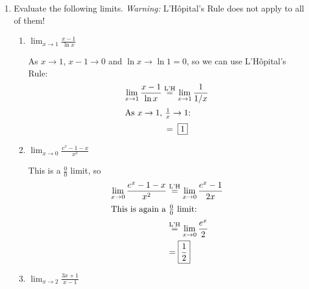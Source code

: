 \documentclass[main]{subfiles}
\begin{document}
\begin{enumerate}
\item 
  Evaluate the following limits.  \emph{Warning:} L'Hôpital's Rule does
  not apply to all of them!
  \begin{enumerate}
  \item
    \begin{problem}[100pt]
      $\displaystyle \lim_{x \to 1} \frac{x - 1}{\ln x}$      
    \end{problem}

    \begin{solution}
      As $x \to 1$, $x - 1 \to 0$ and $\ln x \to \ln 1 =
      0$, so we can use L'Hôpital's Rule:
      \begin{align*}
        \lim_{x \to 1} \frac{x - 1}{\ln x} 
        & \lheq \lim_{x \to 1} \frac{1}{1/x} \\
        \intertext{As $x \to 1$, $\frac{1}{x} \to 1$:}
        & \nolheq \boxed{1}
      \end{align*}
    \end{solution}

  \item


    \begin{problem}[\vfill]
      $\displaystyle \lim_{x \to 0} \frac{e^x - 1 - x}{x^2}$
    \end{problem}

    \begin{solution}
      This is a $\frac{0}{0}$ limit, so
      \begin{align*}
        \lim_{x \to 0} \frac{e^x - 1 - x}{x^2} & \stackrel{\text{L'H}}{=} \lim_{x \to 0}
        \frac{e^x - 1}{2x} \\
        \intertext{This is again a $\frac{0}{0}$ limit:}
        & \stackrel{\text{L'H}}{=} \lim_{x \to 0} \frac{e^x}{2} \\
        &= \boxed{\frac{1}{2}}
      \end{align*}
    \end{solution}

  \item


    \begin{problem}[\vfill\newpage]
      $\displaystyle \lim_{x \to 2} \frac{3x + 1}{x - 1}$
    \end{problem}


\end{enumerate}
\end{enumerate}
\end{document}
